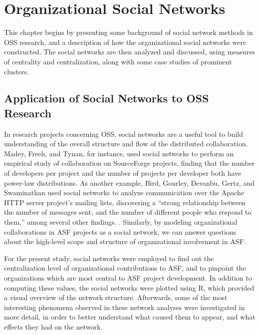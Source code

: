 \chapter{Organizational Social Networks}
This chapter begins by presenting some background of social network methods in OSS research, and a description of how the organizational social networks were constructed. The social networks are then analyzed and discussed, using measures of centrality and centralization, along with some case studies of prominent clusters.

\section{Application of Social Networks to OSS Research}
In research projects concerning OSS, social networks are a useful tool to build understanding of the overall structure and flow of the distributed collaboration. Madey, Freeh, and Tynan\cite{madey2002open}, for instance, used social networks to perform an empirical study of collaboration on SourceForge projects, finding that the number of developers per project and the number of projects per developer both have power-law distributions. As another example, Bird, Gourley, Devanbu, Gertz, and Swaminathan\cite{bird2006mining} used social networks to analyze communication over the Apache HTTP server project's mailing lists, discovering a ``strong relationship between the number of messages sent, and the number of different people who respond to them,'' among several other findings.
. 
 Similarly, by modeling organizational collaborations in ASF projects as a social network, we can answer questions about the high-level scope and structure of organizational involvement in ASF. 

For the present study, social networks were employed to find out the centralization level of organizational contributions to ASF, and to pinpoint the organizations which are most central to ASF project development. In addition to computing these values, the social networks were plotted using R, which provided a visual overview of the network structure. Afterwards, some of the most interesting phenomena observed in these network analyses were investigated in more detail, in order to better understand what caused them to appear, and what effects they had on the network.
